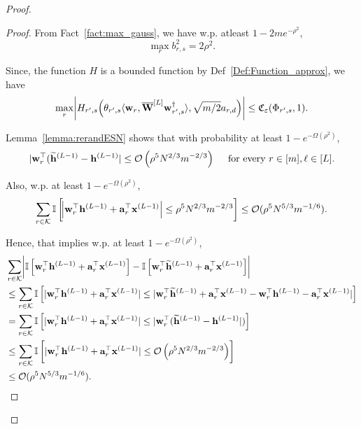 \begin{claim}
\begin{proof}
\begin{proof}
					From Fact~\ref{fact:max_gauss}, we have w.p. atleast $1 - 2me^{-\rho^2}$,
					\begin{equation*}
						\max_{r} b^{2}_{r, s} = 2 \rho^2.
					\end{equation*}
					
					Since, the function $H$ is a bounded function by Def~\ref{Def:Function_approx}, we have
					\begin{equation*}
						\max_{r} \abs{H_{r', s}\Big(\theta_{r', s} \langle \mathbf{w}_{r}, \overline{\mathbf{W}}^{[L]} \mathbf{w}_{r', s}^{\dagger}\rangle, \sqrt{m/2} a_{r, d}\Big)} \le \mathfrak{C}_{\varepsilon}(\Phi_{r', s}, 1).
					\end{equation*}
					
					
					Lemma~\ref{lemma:rerandESN} shows that with probability at least $1 - e^{-\Omega(\rho^2)}$,
					\begin{equation*}
						\abs[0]{\mathbf{w}_r^{\top} (\widetilde{\mathbf{h}}^{(L-1)} -  \mathbf{h}^{(L-1)}} \leq \mathcal{O}\left(\rho^{5} N^{2 / 3} m^{-2 / 3}\right) \quad \text { for every } r \in [m], \ell \in[L].
					\end{equation*}
					
					Also, w.p. at least $1 - e^{-\Omega(\rho^2)}$,
					\begin{equation*}
						\sum_{r \in \mathcal{K}} \mathbb{I}\left[\abs{\mathbf{w}_r^{\top} \mathbf{h}^{(L-1)} + \mathbf{a}_r^{\top} \mathbf{x}^{(L-1)}} \le \rho^{5} N^{2 / 3} m^{-2 / 3}\right] \le \mathcal{O}(\rho^{5} N^{5 / 3} m^{-1/6}).
					\end{equation*}
					
					Hence, that implies  w.p. at least $1 - e^{-\Omega(\rho^2)}$,
					\begin{align*}
						&\sum_{r \in \mathcal{K}} \abs{\mathbb{I}\left[\mathbf{w}_r^{\top} \mathbf{h}^{(L-1)} + \mathbf{a}_r^{\top} \mathbf{x}^{(L-1)} \right] - \mathbb{I}\left[\mathbf{w}_r^{\top} \widetilde{\mathbf{h}}^{(L-1)} + \mathbf{a}_r^{\top} \mathbf{x}^{(L-1)} \right]}\\&
						\le \sum_{r \in \mathcal{K}}\mathbb{I}\left[\abs[0]{\mathbf{w}_r^{\top} \mathbf{h}^{(L-1)} + \mathbf{a}_r^{\top} \mathbf{x}^{(L-1)}} \le \abs[0]{\mathbf{w}_r^{\top} \widetilde{\mathbf{h}}^{(L-1)} + \mathbf{a}_r^{\top} \mathbf{x}^{(L-1)} - \mathbf{w}_r^{\top} \mathbf{h}^{(L-1)} - \mathbf{a}_r^{\top} \mathbf{x}^{(L-1)}} \right] \\&
						= \sum_{r \in \mathcal{K}}\mathbb{I}\left[\abs[0]{\mathbf{w}_r^{\top} \mathbf{h}^{(L-1)} + \mathbf{a}_r^{\top} \mathbf{x}^{(L-1)}} \le \abs[0]{\mathbf{w}_r^{\top} (\widetilde{\mathbf{h}}^{(L-1)} -  \mathbf{h}^{(L-1)}}) \right]
						\\&\le \sum_{r \in \mathcal{K}}\mathbb{I}\left[\abs[0]{\mathbf{w}_r^{\top} \mathbf{h}^{(L-1)} + \mathbf{a}_r^{\top} \mathbf{x}^{(L-1)}} \le \mathcal{O}\left(\rho^{5} N^{2 / 3} m^{-2 / 3}\right) \right] \\&
						\le \mathcal{O}(\rho^{5} N^{5 / 3} m^{-1/6}).
					\end{align*}            
					

\end{proof}
\end{proof}
\end{claim}
